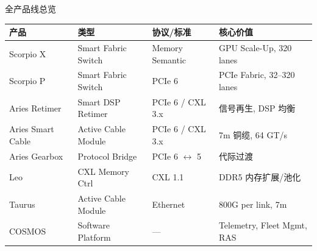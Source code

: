 \documentclass[aspectratio=169, 10pt, UTF8]{ctexbeamer}
\begin{document}
\begin{frame}{全产品线总览}
  \begin{table}[h]
    \centering
    \small
    \begin{tabular}{lllp{}}
      \toprule
      \textbf{产品} & \textbf{类型} & \textbf{协议/标准} & \textbf{核心价值} \\
      \midrule
      \rowcolor{ieeeBlue!12}
      Scorpio X & Smart Fabric Switch & Memory Semantic & GPU Scale-Up, 320 lanes \\
      \rowcolor{ieeeBlue!8}
      Scorpio P & Smart Fabric Switch & PCIe 6 & PCIe Fabric, 32–320 lanes \\
      \midrule
      \rowcolor{ieeeGreen!10}
      Aries Retimer & Smart DSP Retimer & PCIe 6 / CXL 3.x & 信号再生, DSP 均衡 \\
      \rowcolor{ieeeGreen!10}
      Aries Smart Cable & Active Cable Module & PCIe 6 / CXL 3.x & 7m 铜缆, 64 GT/s \\
      \rowcolor{ieeeGreen!10}
      Aries Gearbox & Protocol Bridge & PCIe 6 $\leftrightarrow$ 5 & 代际过渡 \\
      \midrule
      Leo & CXL Memory Ctrl & CXL 1.1 & DDR5 内存扩展/池化 \\
      Taurus & Active Cable Module & Ethernet & 800G per link, 7m \\
      \midrule
      \rowcolor{ieeeOrange!15}
      COSMOS & Software Platform & — & Telemetry, Fleet Mgmt, RAS \\
      \bottomrule
    \end{tabular}
  \end{table}
\end{frame}
\end{document}
